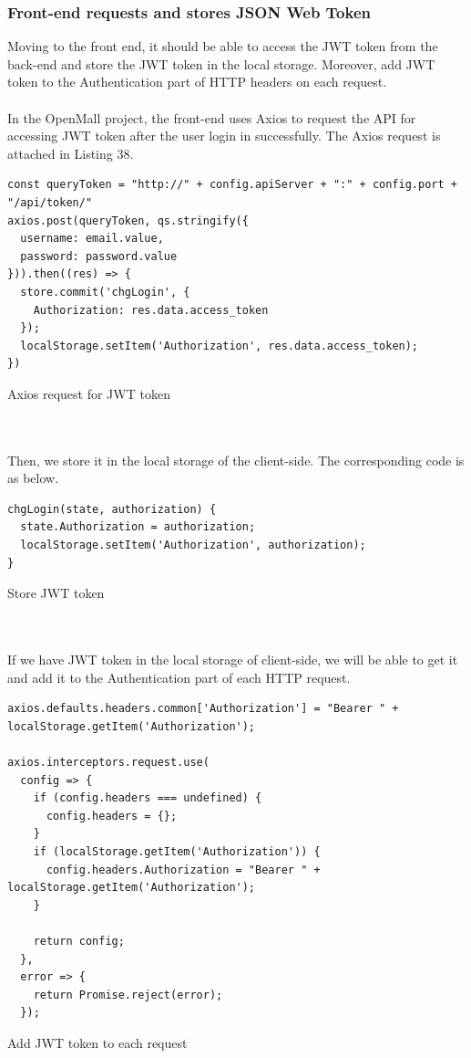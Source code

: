 \documentclass{article}
\begin{document}
\subsubsection{Front-end requests and stores JSON Web Token}

Moving to the front end, it should be able to access the JWT token from the back-end and store the JWT token in the local storage. Moreover, add JWT token to the Authentication part of HTTP headers on each request.
\\\\
In the OpenMall project, the front-end uses Axios to request the API for accessing JWT token after the user login in successfully. The Axios request is attached in Listing 38.

\begin{listing}[!htp]
\begin{verbatim}
const queryToken = "http://" + config.apiServer + ":" + config.port + "/api/token/"
axios.post(queryToken, qs.stringify({
  username: email.value,
  password: password.value
})).then((res) => {
  store.commit('chgLogin', {
    Authorization: res.data.access_token
  });
  localStorage.setItem('Authorization', res.data.access_token);
})
\end{verbatim}
\caption{Axios request for JWT token}
\label{Axios for JWT}
\end{listing}
\leavevmode
\\\\
Then, we store it in the local storage of the client-side. The corresponding code is as below.

\clearpage

\begin{listing}[!htp]
\begin{verbatim}
chgLogin(state, authorization) {
  state.Authorization = authorization;
  localStorage.setItem('Authorization', authorization);
}
\end{verbatim}
\caption{Store JWT token}
\end{listing}
\leavevmode
\\\\
If we have JWT token in the local storage of client-side, we will be able to get it and add it to the Authentication part of each HTTP request.

\begin{listing}[!htp]
\begin{verbatim}
axios.defaults.headers.common['Authorization'] = "Bearer " +
localStorage.getItem('Authorization');

axios.interceptors.request.use(
  config => {
    if (config.headers === undefined) {
      config.headers = {};
    }
    if (localStorage.getItem('Authorization')) {
      config.headers.Authorization = "Bearer " + localStorage.getItem('Authorization');
    }

    return config;
  },
  error => {
    return Promise.reject(error);
  });
\end{verbatim}
\caption{Add JWT token to each request}
\label{Add JWT}
\end{listing}
\end{document}
